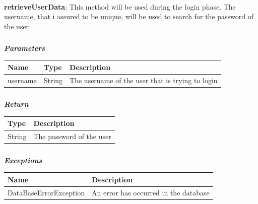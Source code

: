 					\paragraph{}
					\vspace{-2mm}
							\textbf{retrieveUserData}: This method will be used during the login phase. The username, that i assured to be unique, will be used to search for the password of the user
							\subparagraph{}
							\vspace{-3mm}
							\textit{\textbf{Parameters}}
							\vspace{-2mm}
								\begin{table}[!h]
									\begin{tabular}{L{0.2\textwidth}L{0.15\textwidth}L{0.45\textwidth}}
										\toprule
										\textbf{Name} & \textbf{Type} & \textbf{Description} \\
										\midrule
								  		username & String & The username of the user that is trying to login \\
								 		\bottomrule
									\end{tabular}
								\end{table}
							\vspace{-6mm}
							\subparagraph{}
								\textit{\textbf{Return}}
								\vspace{-2mm}
									\begin{table}[!h]
									\begin{tabular}{ll}
										\toprule
										\textbf{Type} & \textbf{Description} \\
										\midrule
								  		String & The password of the user \\
								 		\bottomrule
									\end{tabular}
								\end{table}
							\vspace{-6mm}
							\subparagraph{}
								\textit{\textbf{Exceptions}}
								\vspace{-2mm}
									\begin{table}[!h]
									\begin{tabular}{ll}
										\toprule
										\textbf{Name} & \textbf{Description} \\
										\midrule
								  		DataBaseErrorException & An error has occurred in the database \\ 
								 		\bottomrule
									\end{tabular}
								\end{table}


